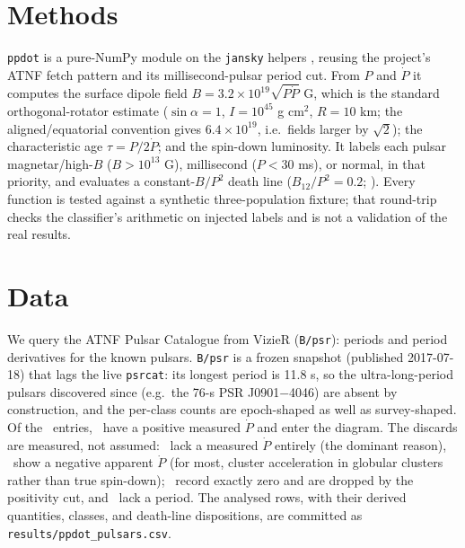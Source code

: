 \documentclass[twocolumn]{aastex631}
\newcommand{\code}[1]{\texttt{#1}}
\begin{document}
\section{Methods}
\code{ppdot} is a pure-NumPy module on the \code{jansky} helpers \citep{jansky}, reusing the project's
ATNF fetch pattern and its millisecond-pulsar period cut. From $P$ and $\dot P$ it computes the surface
dipole field $B=3.2\times10^{19}\sqrt{P\dot P}$ G, which is the standard orthogonal-rotator
estimate ($\sin\alpha=1$, $I=10^{45}$ g cm$^2$, $R=10$ km; the aligned/equatorial convention gives
$6.4\times10^{19}$, i.e.\ fields larger by $\sqrt2$); the characteristic age $\tau=P/2\dot P$; and the
spin-down luminosity. It labels each pulsar magnetar/high-$B$ ($B>10^{13}$ G), millisecond ($P<30$ ms),
or normal, in that priority, and evaluates a constant-$B/P^2$ death line ($B_{12}/P^2=0.2$;
\citealt{rudermansutherland1975,bhattacharya1991}). Every function is tested against a synthetic
three-population fixture; that round-trip checks the classifier's arithmetic on injected labels and is
not a validation of the real results.

\section{Data}
We query the ATNF Pulsar Catalogue \citep{manchester2005} from VizieR (\code{B/psr}): periods and
period derivatives for the known pulsars. \code{B/psr} is a frozen snapshot (published 2017-07-18)
that lags the live \code{psrcat}: its longest period is 11.8 s, so the ultra-long-period pulsars
discovered since (e.g.\ the 76-s PSR J0901$-$4046) are absent by construction, and the per-class
counts are epoch-shaped as well as survey-shaped. Of the \ppNcatalogue\ entries, \ppN\ have a
positive measured $\dot P$ and enter the diagram. The discards are measured, not assumed:
\ppNpdotNull\ lack a measured $\dot P$ entirely (the dominant reason), \ppNpdotNeg\ show a negative apparent $\dot P$ (for most, cluster acceleration in globular clusters rather than true spin-down); \ppNpdotZero\ record exactly zero and are dropped by the positivity cut, and
\ppNpMissing\ lack a period.
The analysed rows, with their derived quantities, classes, and death-line dispositions, are
committed as \code{results/ppdot\_pulsars.csv}.
\end{document}
